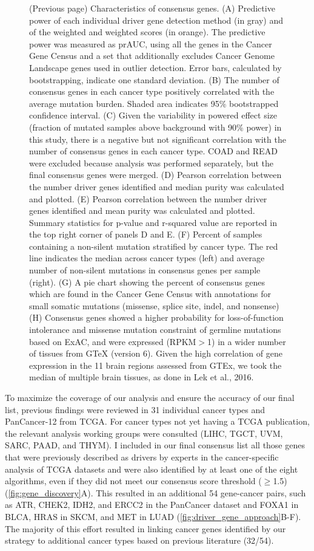 \begin{figure} [t!]
\caption[Characteristics of consensus genes.]{(Previous page) Characteristics of consensus genes. (A) Predictive power of each individual driver gene detection method (in gray) and of the weighted and weighted scores (in orange). The predictive power was measured as prAUC, using all the genes in the Cancer Gene Census and a set that additionally excludes Cancer Genome Landscape genes used in outlier detection. Error bars, calculated by bootstrapping, indicate one standard deviation. (B) The number of consensus genes in each cancer type positively correlated with the average mutation burden. Shaded area indicates 95\% bootstrapped confidence interval. (C) Given the variability in powered effect size (fraction of mutated samples above background with 90\% power) in this study, there is a negative but not significant correlation with the number of consensus genes in each cancer type. COAD and READ were excluded because analysis was performed separately, but the final consensus genes were merged. (D) Pearson correlation between the number driver genes identified and median purity was calculated and plotted. (E) Pearson correlation between the number driver genes identified and mean purity was calculated and plotted. Summary statistics for p-value and r-squared value are reported in the top right corner of panels D and E. (F) Percent of samples containing a non-silent mutation stratified by cancer type. The red line indicates the median across cancer types (left) and average number of non-silent mutations in consensus genes per sample (right). (G) A pie chart showing the percent of consensus genes which are found in the Cancer Gene Census with annotations for small somatic mutations (missense, splice site, indel, and nonsense) (H) Consensus genes showed a higher probability for loss-of-function intolerance and missense mutation constraint of germline mutations based on ExAC, and were expressed (RPKM$>$1) in a wider number of tissues from GTeX (version 6). Given the high correlation of gene expression in the 11 brain regions assessed from GTEx, we took the median of multiple brain tissues, as done in Lek et al., 2016.}
\end{figure}

To maximize the coverage of our analysis and ensure the accuracy of our final list, previous findings were reviewed in 31 individual cancer types and PanCancer-12 from TCGA. For cancer types not yet having a TCGA publication, the relevant analysis working groups were consulted (LIHC, TGCT, UVM, SARC, PAAD, and THYM). I included in our final consensus list all those genes that were previously described as drivers by experts in the cancer-specific analysis of TCGA datasets and were also identified by at least one of the eight algorithms, even if they did not meet our consensus score threshold ($\geq$1.5)(\autoref{fig:gene_discovery}A). This resulted in an additional 54 gene-cancer pairs, such as ATR, CHEK2, IDH2, and ERCC2 in the PanCancer dataset and FOXA1 in BLCA, HRAS in SKCM, and MET in LUAD (\autoref{fig:driver_gene_approach}B-F). The majority of this effort resulted in linking cancer genes identified by our strategy to additional cancer types based on previous literature (32/54).  

